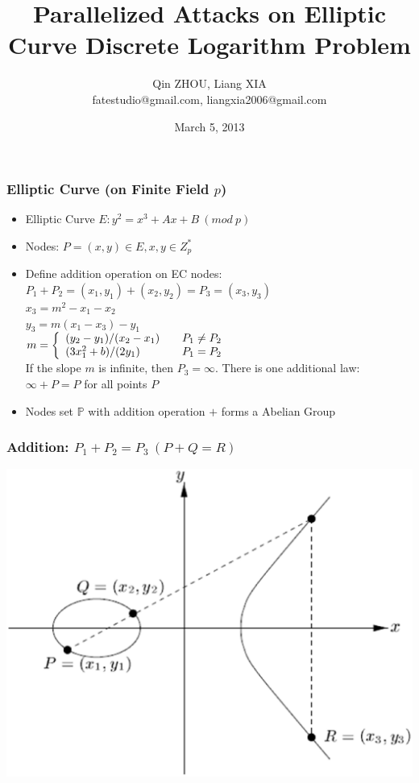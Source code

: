 \documentclass{beamer}
\title{Parallelized Attacks on Elliptic Curve Discrete Logarithm Problem}
\author{Qin ZHOU, Liang XIA \\
fatestudio@gmail.com, liangxia2006@gmail.com}
\institute{University of California, Santa Barbara}
\date{March 5, 2013}
\begin{document}
  \begin{frame}
  	\titlepage
  \end{frame}
  
  \begin{frame}
    \frametitle{Elliptic Curve (on Finite Field $p$)}
    \begin{itemize}
    \item Elliptic Curve $E: y^2 = x^3 + Ax + B\ (mod\ p)$\\
	\item Nodes: $P = (x, y) \in E, x, y \in Z_p^ {\ast}$\\ 
	
	\item Define addition operation on EC nodes:\\ 
	$P_1 + P_2 = (x_1, y_1) + (x_2, y_2) = P_3 = (x_3, y_3) $\\
	
	$x_3 = m^2 - x_1 - x_2$ \\
	$y_3 = m(x_1 - x_3) - y_1$\\
	$m = \left\{
	\begin{array}{l l}
    	(y_2 - y_1)/(x_2 - x_1) & \quad P_1 \neq P_2\\
    	(3x_1^2 + b)/(2y_1) & \quad P_1 = P_2
  	\end{array} \right.$\\
  	If the slope $m$ is infinite, then $P_3 = \infty$. There is one additional law: $\infty + P = P$ for all points $P$\\
  	\item Nodes set $\mathbb{P}$ with addition operation $+$ forms a \alert{Abelian Group}
	\end{itemize}
  \end{frame}
    
  \begin{frame}
  	\frametitle{Addition: $P_1 + P_2 = P_3\ (P + Q = R)$}
  	\includegraphics[scale=0.3]{p1p2.eps}
  \end{frame}
  
\end{document}
